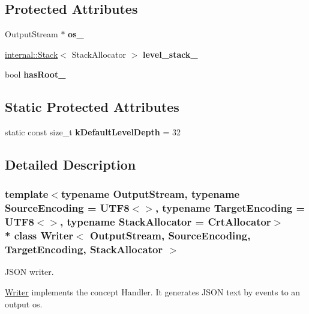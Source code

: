 \subsection*{Protected Attributes}
\begin{DoxyCompactItemize}
\item 
Output\+Stream $\ast$ {\bfseries os\+\_\+}\hypertarget{class_writer_a51ba99f008df7bbf32de311aa22b05ae}{}\label{class_writer_a51ba99f008df7bbf32de311aa22b05ae}

\item 
\hyperlink{classinternal_1_1_stack}{internal\+::\+Stack}$<$ Stack\+Allocator $>$ {\bfseries level\+\_\+stack\+\_\+}\hypertarget{class_writer_af179a9f272f80414d48f64ede9ddde12}{}\label{class_writer_af179a9f272f80414d48f64ede9ddde12}

\item 
bool {\bfseries has\+Root\+\_\+}\hypertarget{class_writer_af252ff409093ea786d5efce0d08d3804}{}\label{class_writer_af252ff409093ea786d5efce0d08d3804}

\end{DoxyCompactItemize}
\subsection*{Static Protected Attributes}
\begin{DoxyCompactItemize}
\item 
static const size\+\_\+t {\bfseries k\+Default\+Level\+Depth} = 32\hypertarget{class_writer_aad47efc97708b2a64e4a0994cbbfae25}{}\label{class_writer_aad47efc97708b2a64e4a0994cbbfae25}

\end{DoxyCompactItemize}


\subsection{Detailed Description}
\subsubsection*{template$<$typename Output\+Stream, typename Source\+Encoding = U\+T\+F8$<$$>$, typename Target\+Encoding = U\+T\+F8$<$$>$, typename Stack\+Allocator = Crt\+Allocator$>$\\*
class Writer$<$ Output\+Stream, Source\+Encoding, Target\+Encoding, Stack\+Allocator $>$}

J\+S\+ON writer. 

\hyperlink{class_writer}{Writer} implements the concept Handler. It generates J\+S\+ON text by events to an output os.


